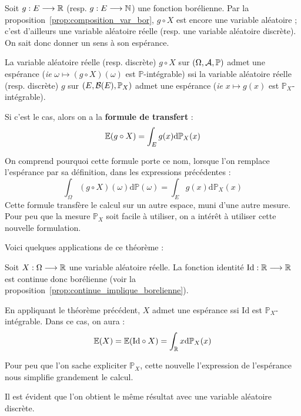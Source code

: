 \documentclass[../integ-proba.tex]{subfiles}
\begin{document}
    \begin{thm}
        Soit $g:E \longrightarrow \mathbb{R}$ (resp. $g:E \longrightarrow \mathbb{N}$) une fonction borélienne.
        Par la proposition~\ref{prop:composition_var_bor}, $g \circ X$ est encore une variable aléatoire ;
        c'est d'ailleurs une variable aléatoire réelle (resp.
        une variable aléatoire discrète).
        On sait donc donner un sens à son espérance.

        La variable aléatoire réelle (resp.
        discrète) $g \circ X$ sur $\left(\Omega, \mathcal{A}, \mathbb{P}\right)$ admet une espérance (\textit{ie} $\omega \mapsto (g \circ X)(\omega)$ est $\mathbb{P}$-intégrable) ssi la variable aléatoire réelle (resp.
        discrète) $g$ sur $\left(E, \mathcal{B}(E), \mathbb{P}_X\right)$ admet une espérance (\textit{ie} $x \mapsto g(x)$ est $\mathbb{P}_X$-intégrable).

        Si c'est le cas, alors on a la \textbf{formule de transfert} :
        \begin{displaymath}
            \mathbb{E}(g \circ X) = \int_E g(x)\textnormal{d}\mathbb{P}_X(x)
        \end{displaymath}
    \end{thm}

    \begin{rem}
        On comprend pourquoi cette formule porte ce nom, lorsque l'on remplace l'espérance par sa définition, dans les expressions précédentes :
        \begin{displaymath}
            \int_\Omega (g \circ X)(\omega) \text{d} \mathbb{P}(\omega) = \int_E g(x) \text{d} \mathbb{P}_X(x)
        \end{displaymath}
        Cette formule transfère le calcul sur un autre espace, muni d'une autre mesure.
        Pour peu que la mesure $\mathbb{P}_X$ soit facile à utiliser, on a intérêt à utiliser cette nouvelle formulation.
    \end{rem}

    Voici quelques applications de ce théorème :

    \begin{exemple}
        Soit $X:\Omega \longrightarrow \mathbb{R}$ une variable aléatoire réelle.
        La fonction identité $\text{Id}:\mathbb{R} \longrightarrow \mathbb{R}$ est continue donc borélienne (voir la proposition~\ref{prop:continue_implique_borelienne}).

        En appliquant le théorème précédent, $X$ admet une espérance ssi $\text{Id}$ est $\mathbb{P}_X$-intégrable.
        Dans ce cas, on aura :
        \begin{displaymath}
            \mathbb{E}(X) = \mathbb{E}(\text{Id} \circ X) = \int_{\mathbb{R}} x\textnormal{d}\mathbb{P}_X(x)
        \end{displaymath}

        Pour peu que l'on sache expliciter $\mathbb{P}_X$, cette nouvelle l'expression de l'espérance nous simplifie grandement le calcul.

        Il est évident que l'on obtient le même résultat avec une variable aléatoire discrète.
    \end{exemple}
\end{document}
